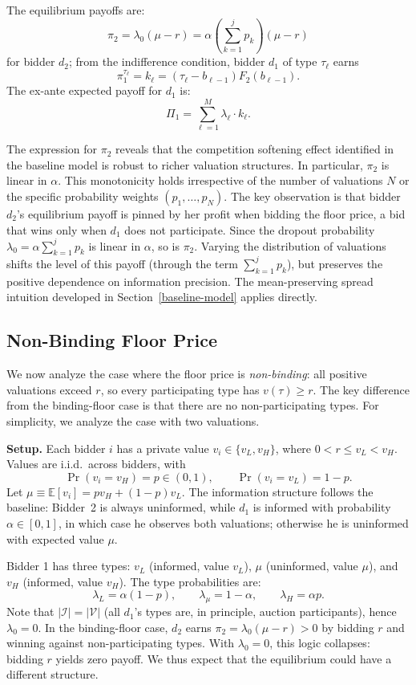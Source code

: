 \noindent The equilibrium payoffs are:
\[
\pi_2 = \lambda_0 (\mu - r) = \alpha \left( \sum_{k=1}^{j} p_k \right) (\mu - r)
\]
for bidder $d_2$; from the indifference condition, bidder $d_1$ of type $\tau_\ell$ earns
\[
\pi_1^{\tau_\ell} = k_\ell = (\tau_\ell - b_{\ell-1}) F_2(b_{\ell-1}).
\]
\noindent The ex-ante expected payoff for $d_1$ is:
\[
\Pi_1 = \sum_{\ell=1}^{M} \lambda_\ell \cdot k_\ell.
\]

\noindent The expression for $\pi_2$ reveals that the competition softening effect identified in the baseline model is robust to richer valuation structures. In particular, $\pi_2$ is linear in $\alpha$. This monotonicity holds irrespective of the number of valuations $N$ or the specific probability weights $(p_1, \ldots, p_N)$. The key observation is that bidder $d_2$'s equilibrium payoff is pinned by her profit when bidding the floor price, a bid that wins only when $d_1$ does not participate. Since the dropout probability $\lambda_0 = \alpha \sum_{k=1}^{j} p_k$ is linear in $\alpha$, so is $\pi_2$. Varying the distribution of valuations shifts the level of this payoff (through the term $\sum_{k=1}^{j} p_k$), but preserves the positive dependence on information precision. The mean-preserving spread intuition developed in Section~\ref{baseline-model} applies directly.

\subsection{Non-Binding Floor Price}\label{sect:nonbinding-floor}
We now analyze the case where the floor price is \textit{non-binding}: all positive valuations exceed $r$, so every participating type has $v(\tau) \geq r$. The key difference from the binding-floor case is that there are no non-participating types. For simplicity, we analyze the case with two valuations.

\noindent \textbf{Setup.} Each bidder $i$ has a private value $v_i \in \{v_L, v_H\}$, where $0 < r \leq v_L < v_H$. Values are i.i.d.\ across bidders, with
\[
\Pr(v_i = v_H) = p \in (0,1), \qquad \Pr(v_i = v_L) = 1 - p.
\]
Let $\mu \equiv \mathbb{E}[v_i] = pv_H + (1-p)v_L$. The information structure follows the baseline: Bidder~2 is always uninformed, while $d_1$ is informed with probability $\alpha \in [0,1]$, in which case he observes both valuations; otherwise he is uninformed with expected value $\mu$.

\noindent Bidder 1 has three types: $v_L$ (informed, value $v_L$), $\mu$ (uninformed, value $\mu$), and $v_H$ (informed, value $v_H$). The type probabilities are:
\[
\lambda_L = \alpha(1-p), \qquad \lambda_{\mu} = 1 - \alpha, \qquad \lambda_H = \alpha p.
\]
Note that $|\mathcal{I}| = |\mathcal{V}|$ (all $d_1$'s types are, in principle, auction participants), hence $\lambda_0 = 0$. In the binding-floor case, $d_2$ earns $\pi_2 = \lambda_0(\mu - r) > 0$ by bidding $r$ and winning against non-participating types. With $\lambda_0 = 0$, this logic collapses: bidding $r$ yields zero payoff. We thus expect that the equilibrium could have a different structure.

